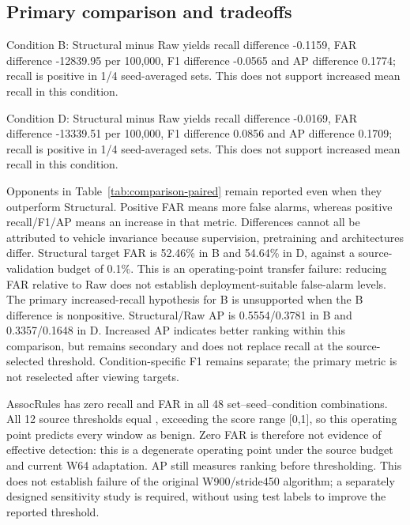 \documentclass[12pt,a4paper,oneside,openany]{extbook}
\DeclareRobustCommand{\code}[1]{\texttt{\detokenize{#1}}}
\begin{document}
\subsection{Primary comparison and tradeoffs}
Condition B: Structural minus Raw yields recall difference -0.1159, FAR difference -12839.95 per 100,000, F1 difference -0.0565 and AP difference 0.1774; recall is positive in 1/4 seed-averaged sets. This does not support increased mean recall in this condition. 

Condition D: Structural minus Raw yields recall difference -0.0169, FAR difference -13339.51 per 100,000, F1 difference 0.0856 and AP difference 0.1709; recall is positive in 1/4 seed-averaged sets. This does not support increased mean recall in this condition. 

Opponents in Table~\ref{tab:comparison-paired} remain reported even when they outperform Structural. Positive FAR means more false alarms, whereas positive recall/F1/AP means an increase in that metric. Differences cannot all be attributed to vehicle invariance because supervision, pretraining and architectures differ.
Structural target FAR is 52.46\% in B and 54.64\% in D, against a source-validation budget of 0.1\%. This is an operating-point transfer failure: reducing FAR relative to Raw does not establish deployment-suitable false-alarm levels. The primary increased-recall hypothesis for B is unsupported when the B difference is nonpositive. Structural/Raw AP is 0.5554/0.3781 in B and 0.3357/0.1648 in D. Increased AP indicates better ranking within this comparison, but remains secondary and does not replace recall at the source-selected threshold. Condition-specific F1 remains separate; the primary metric is not reselected after viewing targets.

AssocRules has zero recall and FAR in all 48 set--seed--condition combinations. All 12 source thresholds equal \code{1.0000000000000002}, exceeding the score range [0,1], so this operating point predicts every window as benign. Zero FAR is therefore not evidence of effective detection: this is a degenerate operating point under the source budget and current W64 adaptation. AP still measures ranking before thresholding. This does not establish failure of the original W900/stride450 algorithm; a separately designed sensitivity study is required, without using test labels to improve the reported threshold.
\end{document}
